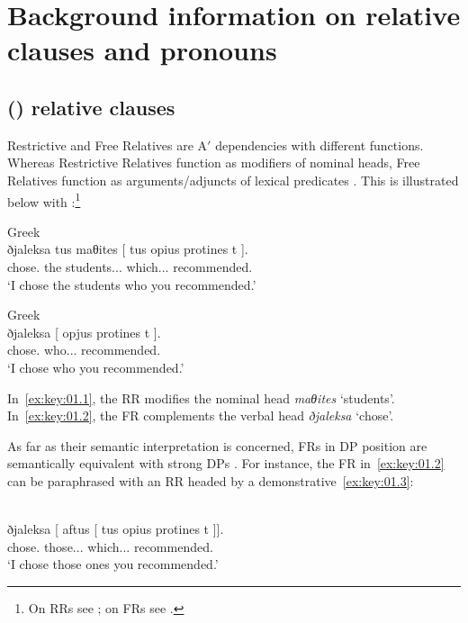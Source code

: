 \documentclass[output=paper]{langsci/langscibook}
\begin{document}
\section{Background information on relative clauses and
pronouns}\label{sec:key:01.2}

\subsection{() relative clauses}\label{sub:key:01.2.1}

Restrictive and Free Relatives are A$'$  dependencies with
different functions. Whereas Restrictive Relatives function as modifiers of
nominal heads, Free Relatives function as arguments/adjuncts of lexical
predicates \parencite{AleLawMeiWil2000,Bianchi2002,GroLan1998}.  This is
illustrated below with :\footnote{On  \glspl{RR} see
\citet{Alexopoulou2006}; on  \glspl{FR} see \textcite{AleVar1997}.}

\ea Greek\label{ex:key:01.1}\\
	\gll ðjaleksa tus maθites [ {tus opius} protines t ].\\
        chose.\Fsg{} the students.\M.\Pl.\Acc{} {} which.\M.\Pl.\Acc{} recommended.\Ssg{} {}\\
	\glt ‘I chose the students who you recommended.'
\z

\ea Greek\label{ex:key:01.2}\\
	\gll ðjaleksa [ opjus protines t ].\\
        chose.\Fsg{} {} who.\M.\Pl.\Acc{} recommended.\Ssg{} {}\\
	\glt \enquote*{I chose who you recommended.}
\z

In~\eqref{ex:key:01.1}, the \gls{RR} modifies the nominal head \emph{maθites}
‘students’. In~\eqref{ex:key:01.2}, the \gls{FR} complements the verbal head \emph{ðjaleksa}
‘chose’.

As far as their semantic interpretation is concerned, \glspl{FR} in DP position
are semantically equivalent with strong DPs \citep{Jacobson1995}. For instance,
the \gls{FR} in~\eqref{ex:key:01.2} can be paraphrased with an \gls{RR} headed
by a demonstrative~\eqref{ex:key:01.3}:

\ea {}\label{ex:key:01.3}\\
	\gll ðjaleksa [ aftus [ {tus opius} protines t ]].\\
    chose.\Fsg{} {} those.\M.\Pl.\Acc{} {} which.\M.\Pl.\Acc{} recommended.\Ssg{} {}\\
	\glt \enquote*{I chose those ones you recommended.}
\z
\end{document}
